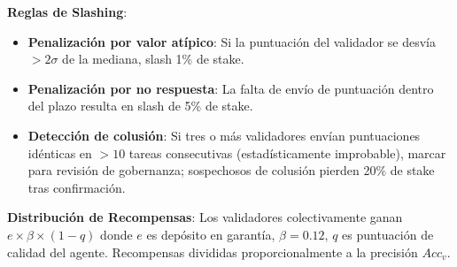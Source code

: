 \documentclass[11pt]{article}
\begin{document}
\textbf{Reglas de Slashing}:
\begin{itemize}[noitemsep]
  \item \textbf{Penalización por valor atípico}: Si la puntuación del validador se desvía $>2\sigma$ de la mediana, slash 1\% de stake.
  \item \textbf{Penalización por no respuesta}: La falta de envío de puntuación dentro del plazo resulta en slash de 5\% de stake.
  \item \textbf{Detección de colusión}: Si tres o más validadores envían puntuaciones idénticas en $>10$ tareas consecutivas (estadísticamente improbable), marcar para revisión de gobernanza; sospechosos de colusión pierden 20\% de stake tras confirmación.
\end{itemize}
\textbf{Distribución de Recompensas}: Los validadores colectivamente ganan $e \times \beta \times (1-q)$ donde $e$ es depósito en garantía, $\beta=0.12$, $q$ es puntuación de calidad del agente. Recompensas divididas proporcionalmente a la precisión $Acc_v$.
\end{document}
